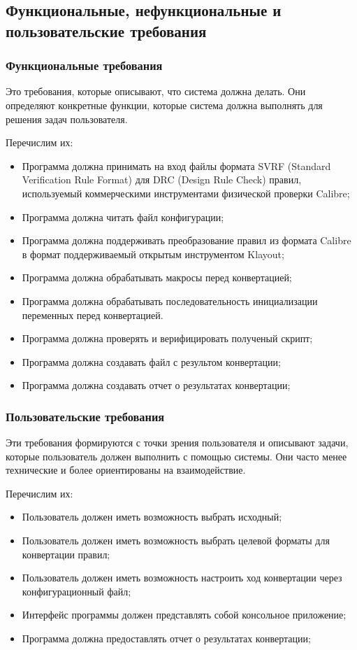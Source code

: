\subsection{Функциональные, нефункциональные и пользовательские требования}

\subsubsection{Функциональные требования}

Это требования, которые описывают, что система должна делать.
Они определяют конкретные функции,
которые система должна выполнять для решения задач пользователя.

Перечислим их:

\begin{itemize}
    \item Программа должна принимать на вход файлы
		формата SVRF (Standard Verification Rule Format)
		для DRC (Design Rule Check) правил,
		используемый коммерческими инструментами физической проверки
		Calibre;
	\item Программа должна читать файл конфигурации;
    \item Программа должна поддерживать преобразование правил из формата
		Calibre в формат поддерживаемый открытым инструментом Klayout;
    \item Программа должна обрабатывать макросы перед конвертацией;
    \item Программа должна обрабатывать последовательность 
		инициализации переменных перед конвертацией.
	\item Программа должна проверять и верифицировать полученый скрипт;
	\item Программа должна создавать файл с результом конвертации;
	\item Программа должна создавать отчет о результатах конвертации;
\end{itemize}

\subsubsection{Пользовательские требования}

Эти требования формируются с точки зрения пользователя и описывают задачи,
которые пользователь должен выполнить с помощью системы.
Они часто менее технические и более ориентированы на взаимодействие.

Перечислим их:

\begin{itemize}
    \item Пользователь должен иметь возможность выбрать исходный;
    \item Пользователь должен иметь возможность выбрать
		целевой форматы для конвертации правил;
    \item Пользователь должен иметь возможность настроить ход конвертации
		через конфигурационный файл;
    \item Интерфейс программы должен представлять собой консольное приложение;
    \item Программа должна предоставлять отчет о результатах конвертации;
\end{itemize}

